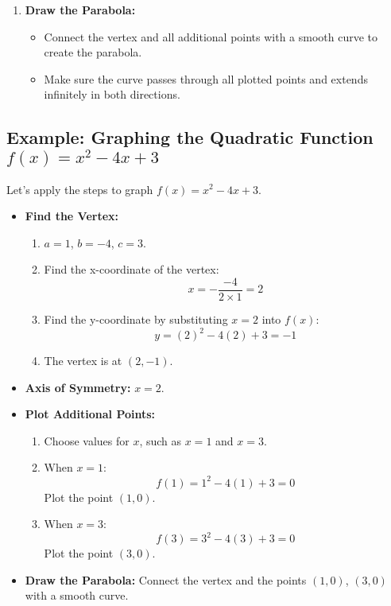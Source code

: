 \begin{enumerate}
    \item \textbf{Draw the Parabola:}
    \begin{itemize}
        \item Connect the vertex and all additional points with a smooth curve to create the parabola.
        \item Make sure the curve passes through all plotted points and extends infinitely in both directions.
    \end{itemize}
\end{enumerate}

\subsection{Example: Graphing the Quadratic Function \( f(x) = x^2 - 4x + 3 \)}

Let's apply the steps to graph \( f(x) = x^2 - 4x + 3 \).

\begin{itemize}
    \item \textbf{Find the Vertex:}
    \begin{enumerate}[label=(\alph*)]
        \item \( a = 1 \), \( b = -4 \), \( c = 3 \).
        \item Find the x-coordinate of the vertex:
        \[
        x = -\frac{-4}{2 \times 1} = 2
        \]
        \item Find the y-coordinate by substituting \( x = 2 \) into \( f(x) \):
        \[
        y = (2)^2 - 4(2) + 3 = -1
        \]
        \item The vertex is at \( (2, -1) \).
    \end{enumerate}
    
    \item \textbf{Axis of Symmetry:} \( x = 2 \).
    
    \item \textbf{Plot Additional Points:}
    \begin{enumerate}[label=(\alph*)]
        \item Choose values for \( x \), such as \( x = 1 \) and \( x = 3 \).
        \item When \( x = 1 \):
        \[
        f(1) = 1^2 - 4(1) + 3 = 0
        \]
        Plot the point \( (1, 0) \).
        \item When \( x = 3 \):
        \[
        f(3) = 3^2 - 4(3) + 3 = 0
        \]
        Plot the point \( (3, 0) \).
    \end{enumerate}
    
    \item \textbf{Draw the Parabola:} Connect the vertex and the points \( (1, 0) \), \( (3, 0) \) with a smooth curve.
\end{itemize}

